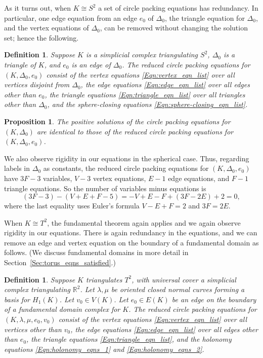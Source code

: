 \documentclass[12pt]{amsart}
\numberwithin{equation}{section}
\newtheorem{proposition}[equation]{Proposition}
\newtheorem{definition}[equation]{Definition}
\theoremstyle{named}
\newcommand{\refsec}[1]{Section~\ref{Sec:#1}}
\newcommand{\refeqn}[1]{\eqref{Eqn:#1}}
\newcommand{\R}{\mathbb{R}}
\begin{document}
As it turns out, when $K \cong S^2$ a set of circle packing equations has redundancy. In particular, one edge equation from an edge $e_0$ of $\Delta_0$, the triangle equation for $\Delta_0$, and the vertex equations of $\Delta_0$, can be removed without changing the solution set; hence the following.
\begin{definition}
\label{Def:reduced_eqns_S2}
Suppose $K$ is a simplicial complex triangulating $S^2$, $\Delta_0$ is a triangle of $K$, and $e_0$ is an edge of $\Delta_0$. The \emph{reduced circle packing equations} for $(K, \Delta_0, e_0)$ consist of the vertex equations \refeqn{vertex_eqn_list} over all vertices disjoint from $\Delta_0$, the edge equations \refeqn{edge_eqn_list} over all edges other than $e_0$, the triangle equations \refeqn{triangle_eqn_list} over all triangles other than $\Delta_0$, and the sphere-closing equations \refeqn{sphere-closing_eqn_list}.
\end{definition}

\begin{proposition}
\label{Prop:circle_packing_reduction}
The positive solutions of the circle packing equations for $(K, \Delta_0)$ are identical to those of the reduced circle packing equations for $(K, \Delta_0, e_0)$.
\end{proposition}

We also observe rigidity in our equations in the spherical case. Thus, regarding labels in $\Delta_0$ as constants, the reduced circle packing equations for $(K, \Delta_0, e_0)$ have $3F-3$ variables, $V-3$ vertex equations, $E-1$ edge equations, and $F-1$ triangle equations. So the number of variables minus equations is
\[
\left( 3F-3 \right) - \left( V+E+F - 5 \right)
= -V+E-F + (3F-2E) +2
= 0,
\]
where the last equality uses Euler's formula $V-E+F=2$ and $3F=2E$.

When $K \cong T^2$, the fundamental theorem again applies and we again observe rigidity in our equations. There is again redundancy in the equations, and we can remove an edge and vertex equation on the boundary of a fundamental domain as follows. (We discuss fundamental domains in more detail in \refsec{torus_eqns_satisfied}.)
\begin{definition}
\label{Def:reduced_eqns_torus}
Suppose $K$ triangulates $T^2$, with universal cover a simplicial complex triangulating $\R^2$. Let $\lambda, \mu$ be oriented closed normal curves forming a basis for $H_1 (K)$. Let $v_0 \in V(K)$. Let $e_0 \in E(K)$ be an edge on the boundary of a fundamental domain complex for $K$. The \emph{reduced circle packing equations} for $(K, \lambda, \mu, e_0, v_0)$ consist of the vertex equations \refeqn{vertex_eqn_list} over all vertices other than $v_0$, the edge equations \refeqn{edge_eqn_list} over all edges other than $e_0$, the triangle equations \refeqn{triangle_eqn_list}, and the holonomy equations \refeqn{holonomy_eqns_1} and \refeqn{holonomy_eqns_2}.
\end{definition}
\end{document}

